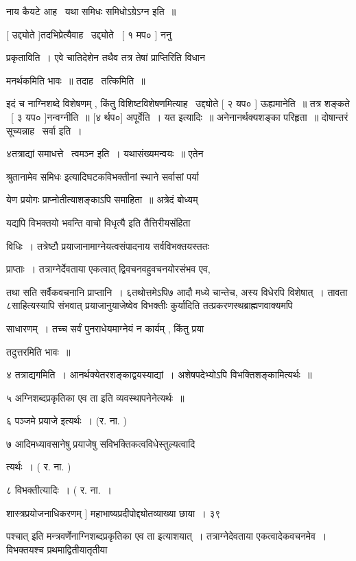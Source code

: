 \documentclass[11pt, openany]{book}
\begin{document}
नाय कैयटे आह \textendash\ यथा समिधः समिधोऽग्रेऽग्न इति~॥

 [ उद्द्योते ]तदभिप्रेत्यैवाह \textendash\ उद्द्योते \textendash\ [ १ मप० ] ननु

प्रकृताविति~। एवे चातिदेशेन तथैव तत्र तेषां प्राप्तिरिति विधान \textendash\ 

मनर्थकमिति भावः~॥ तदाह \textendash\ तत्किमिति~॥

 इदं च नाग्निशब्दे विशेषणम् , किंतु विशिष्टविशेषणमित्याह \textendash\ उद्द्योते [
२ यप० ] ऊह्यमानेति~॥ तत्र शङ्कते \textendash\ [ ३ यप० ]नन्वग्नीति~॥ [४
र्थप०] अपूर्वेति~। यत इत्यादिः~॥ अनेनानर्थक्यशङ्का परिहृता~॥
दोषान्तरं सूच्यन्नाह \textendash\ सर्वा इति~। 

४तत्राद्यां समाधत्ते \textendash\ त्वमञ्न इति~। यथासंख्यमन्वयः~॥ एतेन

श्रुतानामेव {\qt समिधः} इत्यादिघटकविभक्तीनां स्थाने सर्वासां पर्या \textendash\ 

येण प्रयोगः प्राप्नोतीत्याशङ्काऽपि समाहिता~॥ अत्रेदं बोध्यम् \textendash\ 

यद्यपि {\qt विभक्तयो भवन्ति वाचो विधृत्यै} इति तैत्तिरीयसंहिता \textendash\ 

विधिः~। तत्रेष्टौ प्रयाजानामाग्नेयत्वसंपादनाय सर्वविभक्तयस्ततः

प्राप्ताः~। तत्राग्नेर्देवताया एकत्वात् द्विवचनवहुवचनयोरसंभव एव,

तथा सति सर्वैकवचनानि प्राप्तानि~। ६तथोत्तमेऽपि७ आदौ मध्ये चान्तेच, अस्य
विधेरपि विशेषात्~। तावता ८साहित्यस्यापि संभवात् प्रयाजानुयाजेष्वेव
विभक्तीः कुर्यादिति तत्प्रकरणस्थब्राह्मणवाक्यमपि

साधारणम्~। तच्च सर्वं पुनराधेयमाग्नेयं न कार्यम् , किंतु प्रया \textendash\ 



तदुत्तरमिति भावः~॥

४ तत्राद्यगमिति~। आनर्थक्येतरशङ्काद्वयस्याद्यां~। अशेषपदेभ्योऽपि
विभक्तिशङ्कामित्यर्थः~॥

५ अग्निशब्दप्रकृतिका एव ता इति व्यवस्थापनेनेत्यर्थः~॥

६ पञ्जमे प्रयाजे इत्यर्थः~। (र. ना. )

७ आदिमध्यावसानेषु प्रयाजेषु सविभक्तिकत्वविधेस्तुल्यत्वादि \textendash\ 

त्यर्थः~। ( र. ना. )

८ विभक्तीत्यादिः~। ( र. ना.~। 

शास्त्रप्रयोजनाधिकरणम् ] महाभाष्यप्रदीपोद्द्योतव्याख्या छाया~। ३९



पश्चात् इति मन्त्रवर्णेनाग्निशब्दप्रकृतिका एव ता इत्याशयात्~। 
तत्राग्नेदेवताया एकत्वादेकवचनमेव~। विभक्तयश्च प्रथमाद्वितीयातृतीया \textendash\ 
\end{document}
